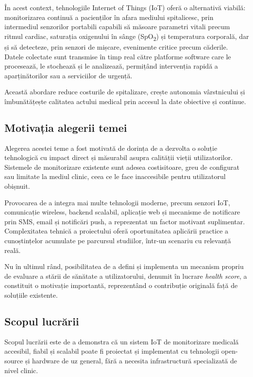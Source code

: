﻿\documentclass[12pt,a4paper,twoside]{article}
\newcommand{\spo}{SpO\textsubscript{2}}
\begin{document}
În acest context, tehnologiile Internet of Things (IoT) oferă o alternativă viabilă: monitorizarea continuă a pacienților în afara mediului spitalicesc, prin intermediul senzorilor portabili capabili să măsoare parametri vitali precum ritmul cardiac, saturația oxigenului în sânge (\spo) și temperatura corporală, dar și să detecteze, prin senzori de mișcare, evenimente critice precum căderile. Datele colectate sunt transmise în timp real către platforme software care le procesează, le stochează și le analizează, permițând intervenția rapidă a aparținătorilor sau a serviciilor de urgență.

Această abordare reduce costurile de spitalizare, crește autonomia vârstnicului și îmbunătățește calitatea actului medical prin accesul la date obiective și continue.

\subsection{Motivația alegerii temei}

Alegerea acestei teme a fost motivată de dorința de a dezvolta o soluție tehnologică cu impact direct și măsurabil asupra calității vieții utilizatorilor. Sistemele de monitorizare existente sunt adesea costisitoare, greu de configurat sau limitate la mediul clinic, ceea ce le face inaccesibile pentru utilizatorul obișnuit.

Provocarea de a integra mai multe tehnologii moderne, precum senzori IoT, comunicație wireless, backend scalabil, aplicație web și mecanisme de notificare prin SMS, email și notificări push, a reprezentat un factor motivant suplimentar. Complexitatea tehnică a proiectului oferă oportunitatea aplicării practice a cunoștințelor acumulate pe parcursul studiilor, într-un scenariu cu relevanță reală.

Nu în ultimul rând, posibilitatea de a defini și implementa un mecanism propriu de evaluare a stării de sănătate a utilizatorului, denumit în lucrare \textit{health score}, a constituit o motivație importantă, reprezentând o contribuție originală față de soluțiile existente.

\subsection{Scopul lucrării}

Scopul lucrării este de a demonstra că un sistem IoT de monitorizare medicală accesibil, fiabil și scalabil poate fi proiectat și implementat cu tehnologii open-source și hardware de uz general, fără a necesita infrastructură specializată de nivel clinic.
\end{document}
